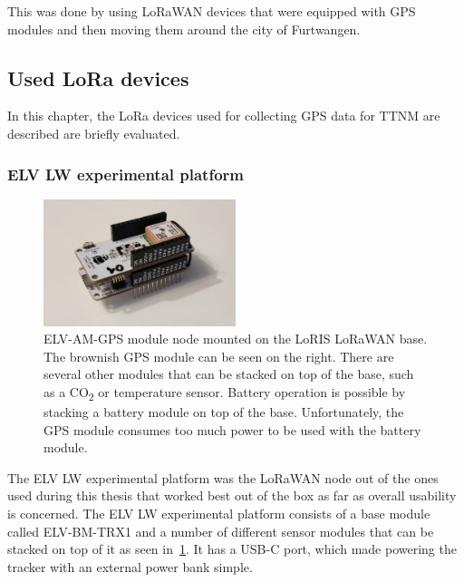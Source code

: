 This was done by using \ac{LoRaWAN} devices that were equipped with \ac{GPS} modules and then moving them around the city of Furtwangen.

\subsection{Used \acs{LoRa} devices}\label{subsec:used-lora-devices}

In this chapter, the \ac{LoRa} devices used for collecting \ac{GPS} data for \ac{TTNM} are described are briefly evaluated.

\subsubsection{ELV LW experimental platform}\label{subsubsec:elv-lw-experimental-platform}

\begin{figure}[htbp]
    \centering
    \includegraphics[width=0.5\textwidth]{pictures/hardware/gps-nodes/loris_bare.jpg}
    \caption{
        ELV-AM-GPS module node mounted on the LoRIS \ac{LoRaWAN} base.
        The brownish \ac{GPS} module can be seen on the right.
        There are several other modules that can be stacked on top of the base, such as a CO\textsubscript{2} or temperature sensor.
        Battery operation is possible by stacking a battery module on top of the base.
        Unfortunately, the \ac{GPS} module consumes too much power to be used with the battery module.
    }\label{pic:loris-node-bare}
\end{figure}

The ELV LW experimental platform was the \ac{LoRaWAN} node out of the ones used during this thesis that worked best out of the box as far as overall usability is concerned.
The ELV LW experimental platform consists of a base module called ELV-BM-TRX1 and a number of different sensor modules that can be stacked on top of it as seen in~\cref{pic:loris-node-bare}\cite{elv_elektronik_ag_elv-lw-base_2023}.
It has a USB-C port, which made powering the tracker with an external power bank simple.

